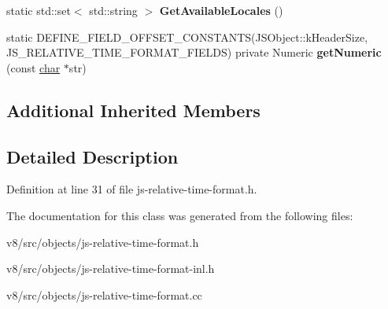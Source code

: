 \begin{DoxyCompactItemize}
\item 
\mbox{\label{classv8_1_1internal_1_1JSRelativeTimeFormat_a000c92c57c5b3cde87e44a3f5e1b9f84}} 
static std\+::set$<$ std\+::string $>$ {\bfseries Get\+Available\+Locales} ()
\item 
\mbox{\label{classv8_1_1internal_1_1JSRelativeTimeFormat_a20a86e6b78bd5d32a518adcc7cdcc4bc}} 
static D\+E\+F\+I\+N\+E\+\_\+\+F\+I\+E\+L\+D\+\_\+\+O\+F\+F\+S\+E\+T\+\_\+\+C\+O\+N\+S\+T\+A\+N\+TS(J\+S\+Object\+::k\+Header\+Size, J\+S\+\_\+\+R\+E\+L\+A\+T\+I\+V\+E\+\_\+\+T\+I\+M\+E\+\_\+\+F\+O\+R\+M\+A\+T\+\_\+\+F\+I\+E\+L\+DS) private Numeric {\bfseries get\+Numeric} (const \mbox{\hyperlink{classchar}{char}} $\ast$str)
\end{DoxyCompactItemize}
\subsection*{Additional Inherited Members}


\subsection{Detailed Description}


Definition at line 31 of file js-\/relative-\/time-\/format.\+h.



The documentation for this class was generated from the following files\+:\begin{DoxyCompactItemize}
\item 
v8/src/objects/js-\/relative-\/time-\/format.\+h\item 
v8/src/objects/js-\/relative-\/time-\/format-\/inl.\+h\item 
v8/src/objects/js-\/relative-\/time-\/format.\+cc\end{DoxyCompactItemize}
